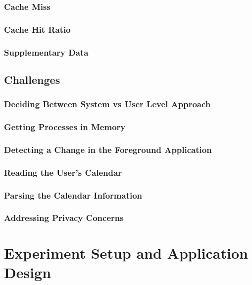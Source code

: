 \documentclass[12pt]{uthesis-v12}  %
\begin{document}
		\subsection{Cache Miss}
		
		\subsection{Cache Hit Ratio}
		
		\subsection{Supplementary Data}
	
	\section{Challenges}
		
		\subsection{Deciding Between System vs User Level Approach}
		
		\subsection{Getting Processes in Memory}
		
		\subsection{Detecting a Change in the Foreground Application}
		
		\subsection{Reading the User's Calendar}
		
		\subsection{Parsing the Calendar Information}
		
		\subsection{Addressing Privacy Concerns}

\chapter{Experiment Setup and Application Design}
	
\end{document}

